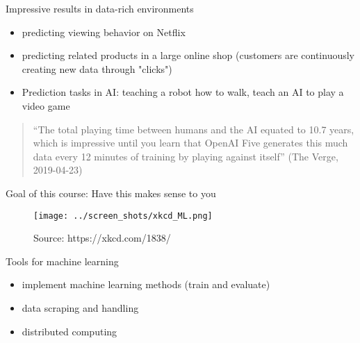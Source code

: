 \documentclass[xcolor=dvipsnames]{beamer}
\begin{document}
\begin{frame}{Impressive results in data-rich environments}
\begin{itemize}
  \item 
  predicting viewing behavior on Netflix
  \item 
  predicting related products in a large online shop (customers are continuously creating new data through "clicks")
  \item 
  \pause
  Prediction tasks in AI: teaching a robot how to walk, teach an AI to play a video game 
\end{itemize}
\begin{quote}
``The total playing time between humans and the AI equated to 10.7 years, which is impressive until you learn that OpenAI Five generates this much data every 12 minutes of training by playing against itself'' (The Verge, 2019-04-23)
\end{quote}
\end{frame}


\begin{frame}{Goal of this course: Have this makes sense to you}
\begin{figure}
  \texttt{[image: ../screen\_shots/xkcd\_ML.png]}
   \caption{Source: https://xkcd.com/1838/}
\end{figure}
\end{frame}


\begin{frame}{Tools for machine learning}
\begin{itemize}
  \item implement machine learning methods (train and evaluate)
  \item data scraping and handling 
  \item distributed computing 
\end{itemize}
\end{frame}
\end{document}
